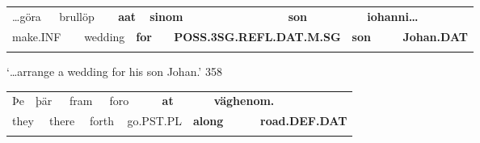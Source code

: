 \begin{listWWNumlxxxivleveli}
\item {}

\end{listWWNumlxxxivleveli}

\begin{tabular}{llllllllllll}
\lsptoprule
…göra & \multicolumn{2}{l}{brullöp

} & \multicolumn{2}{l}{{\bfseries aat}

} & \multicolumn{2}{l}{{\bfseries sinom}

} & \multicolumn{2}{l}{{\bfseries son}

} & \multicolumn{2}{l}{{\bfseries iohanni…}

} & \\
\multicolumn{2}{l}{make.INF

} & \multicolumn{2}{l}{wedding

} & \multicolumn{2}{l}{{\bfseries for}

} & \multicolumn{2}{l}{{\bfseries POSS.3SG.REFL.DAT.M.SG}

} & \multicolumn{2}{l}{{\bfseries son}

} & \multicolumn{2}{l}{{\bfseries Johan.DAT}

}\\
\lspbottomrule
\end{tabular}

\begin{styleTranslation}
‘…arrange a wedding for his son Johan.’ 358

\end{styleTranslation}

\begin{tabular}{llllllllllll}
\lsptoprule
Þe & \multicolumn{2}{l}{þär

} & \multicolumn{2}{l}{fram

} & \multicolumn{2}{l}{foro

} & \multicolumn{2}{l}{{\bfseries at}

} & \multicolumn{2}{l}{{\bfseries väghenom.}

} & \\
\multicolumn{2}{l}{they

} & \multicolumn{2}{l}{there

} & \multicolumn{2}{l}{forth

} & \multicolumn{2}{l}{go.PST.PL

} & \multicolumn{2}{l}{{\bfseries along}

} & \multicolumn{2}{l}{{\bfseries road.DEF.DAT}

}\\
\lspbottomrule
\end{tabular}

